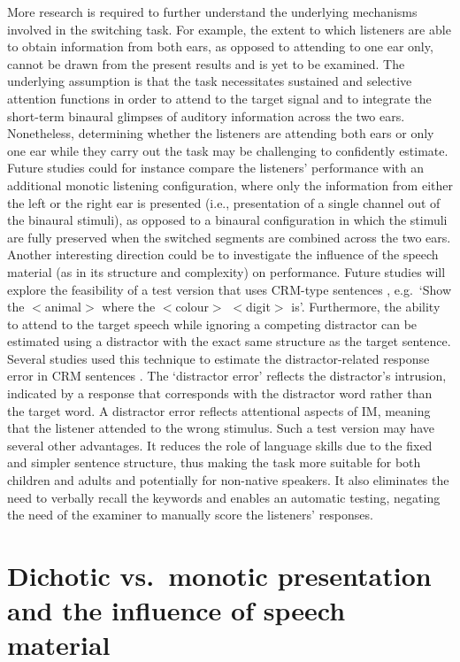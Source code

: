 \documentclass[a4paper, twoside]{templates/ociamthesis}
\begin{document}
More research is required to further understand the underlying mechanisms involved in the switching task. For example, the extent to which listeners are able to obtain information from both ears, as opposed to attending to one ear only, cannot be drawn from the present results and is yet to be examined. The underlying assumption is that the task necessitates sustained and selective attention functions in order to attend to the target signal and to integrate the short-term binaural glimpses of auditory information across the two ears. Nonetheless, determining whether the listeners are attending both ears or only one ear while they carry out the task may be challenging to confidently estimate. Future studies could for instance compare the listeners' performance with an additional monotic listening configuration, where only the information from either the left or the right ear is presented (i.e., presentation of a single channel out of the binaural stimuli), as opposed to a binaural configuration in which the stimuli are fully preserved when the switched segments are combined across the two ears.
Another interesting direction could be to investigate the influence of the speech material (as in its structure and complexity) on performance. Future studies will explore the feasibility of a test version that uses CRM-type sentences \autocite{Bolia2000}, e.g.~`Show the \(<\)animal\(>\) where the \(<\)colour\(>\) \(<\)digit\(>\) is'. Furthermore, the ability to attend to the target speech while ignoring a competing distractor can be estimated using a distractor with the exact same structure as the target sentence. Several studies used this technique to estimate the distractor-related response error in CRM sentences \autocite[e.g.,][]{Brungart2001}. The `distractor error' reflects the distractor's intrusion, indicated by a response that corresponds with the distractor word rather than the target word. A distractor error reflects attentional aspects of IM, meaning that the listener attended to the wrong stimulus. Such a test version may have several other advantages. It reduces the role of language skills due to the fixed and simpler sentence structure, thus making the task more suitable for both children and adults and potentially for non-native speakers. It also eliminates the need to verbally recall the keywords and enables an automatic testing, negating the need of the examiner to manually score the listeners' responses.\\

\hypertarget{dichotic-vs.-monotic-presentation-and-the-influence-of-speech-material}{%
\section{Dichotic vs.~monotic presentation and the influence of speech material}\label{dichotic-vs.-monotic-presentation-and-the-influence-of-speech-material}}
\end{document}
